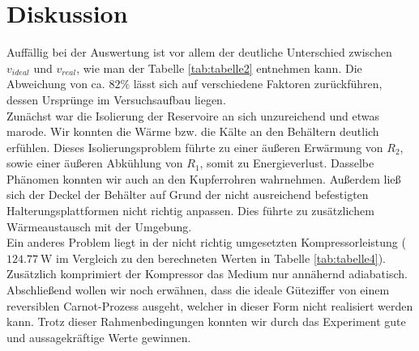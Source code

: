 \section{Diskussion}
\label{sec:Diskussion}
Auffällig bei der Auswertung ist vor allem der deutliche Unterschied zwischen $ v_{ideal} $ und $ v_{real} $, wie man der Tabelle \ref{tab:tabelle2} entnehmen kann.
Die Abweichung von ca. $82\%$ lässt sich auf verschiedene Faktoren zurückführen, dessen Ursprünge im Versuchsaufbau liegen.\\
Zunächst war die Isolierung der Reservoire an sich unzureichend und etwas marode.
Wir konnten die Wärme bzw. die Kälte an den Behältern deutlich erfühlen.
Dieses Isolierungsproblem führte zu einer äußeren Erwärmung von $R_2$, sowie einer äußeren Abkühlung von $R_1$, somit zu Energieverlust.
Dasselbe Phänomen konnten wir auch an den Kupferrohren wahrnehmen.
Außerdem ließ sich der Deckel der Behälter auf Grund der nicht ausreichend befestigten Halterungsplattformen nicht richtig anpassen.
Dies führte zu zusätzlichem Wärmeaustausch mit der Umgebung.\\
Ein anderes Problem liegt in der nicht richtig umgesetzten Kompressorleistung ($\SI{124,77}{\watt}$ im Vergleich zu den berechneten Werten in Tabelle \ref{tab:tabelle4}).
Zusätzlich komprimiert der Kompressor das Medium nur annähernd adiabatisch.\\
Abschließend wollen wir noch erwähnen, dass die ideale Güteziffer von einem reversiblen Carnot-Prozess ausgeht, welcher in dieser Form nicht realisiert werden kann.
Trotz dieser Rahmenbedingungen konnten wir durch das Experiment gute und aussagekräftige Werte gewinnen.
